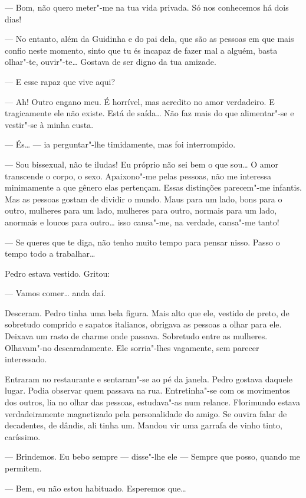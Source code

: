 --- Bom, não quero meter"-me na tua vida privada. Só nos conhecemos há dois
dias!

--- No entanto, além da Guidinha e do pai dela, que são as pessoas em que
mais confio neste momento, sinto que tu és incapaz de fazer mal a
alguém, basta olhar"-te, ouvir"-te\ldots{} Gostava de ser digno da tua amizade.

--- E esse rapaz que vive aqui?

--- Ah! Outro engano meu. É horrível, mas acredito no amor verdadeiro. E
tragicamente ele não existe. Está de saída\ldots{} Não faz mais do que
alimentar"-se e vestir"-se à minha custa.

--- És\ldots{} --- ia perguntar"-lhe timidamente, mas foi interrompido.

--- Sou bissexual, não te iludas! Eu próprio não sei bem o que
sou\ldots{} O amor transcende o corpo, o sexo. Apaixono"-me pelas pessoas,
não me interessa minimamente a que gênero elas pertençam. Essas
distinções parecem"-me infantis. Mas as pessoas gostam de dividir o
mundo. Maus para um lado, bons para o outro, mulheres para um lado,
mulheres para outro, normais para um lado, anormais e loucos para
outro\ldots{} isso cansa"-me, na verdade, cansa"-me tanto!

--- Se queres que te diga, não tenho muito tempo para pensar nisso. Passo
o tempo todo a trabalhar\ldots{}

Pedro estava vestido. Gritou:

--- Vamos comer\ldots{} anda daí.

Desceram. Pedro tinha uma bela figura. Mais alto que ele, vestido de
preto, de sobretudo comprido e sapatos italianos, obrigava as pessoas a
olhar para ele. Deixava um rasto de charme onde passava. Sobretudo entre
as mulheres. Olhavam"-no descaradamente. Ele sorria"-lhes vagamente, sem
parecer interessado.

Entraram no restaurante e sentaram"-se ao pé da janela. Pedro gostava
daquele lugar. Podia observar quem passava na rua. Entretinha"-se com os
movimentos dos outros, lia no olhar das pessoas, estudava"-as num
relance. Florimundo estava verdadeiramente magnetizado pela
personalidade do amigo. Se ouvira falar de decadentes, de dândis, ali
tinha um. Mandou vir uma garrafa de vinho tinto, caríssimo.

--- Brindemos. Eu bebo sempre --- disse"-lhe ele --- Sempre que posso, quando me
permitem.

--- Bem, eu não estou habituado. Esperemos que\ldots{}

